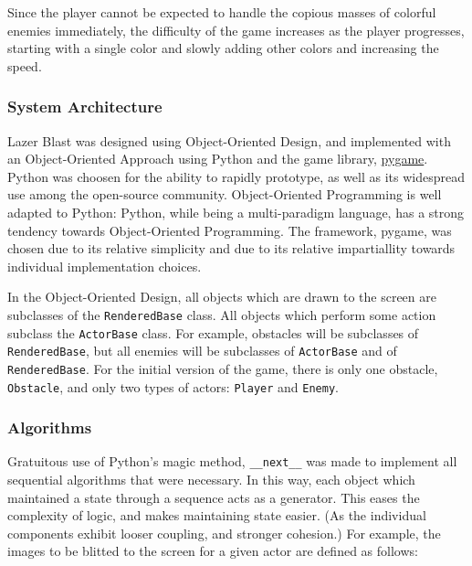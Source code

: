 Since the player cannot be expected to handle the copious masses
of colorful enemies immediately, the difficulty of the game increases
as the player progresses, starting with a single color and slowly
adding other colors and increasing the speed.

\subsubsection*{System Architecture}
Lazer Blast was designed using Object-Oriented Design, and implemented
with an Object-Oriented Approach using Python and the game library,
\href{http://pygame.org/news}{pygame}.  Python was choosen for the
ability to rapidly prototype, as well as its widespread use among
the open-source community.  Object-Oriented Programming is well
adapted to Python: Python, while being a multi-paradigm language,
has a strong tendency towards Object-Oriented Programming.  The
framework, pygame, was chosen due to its relative simplicity and due
to its relative impartiallity towards individual implementation choices.

In the Object-Oriented Design, all objects which are drawn to the screen
are subclasses of the \texttt{RenderedBase} class.  All
objects which perform some action subclass the \texttt{ActorBase}
class.  For example, obstacles will be subclasses of
\texttt{RenderedBase}, but all enemies will be subclasses of
\texttt{ActorBase} and of \texttt{RenderedBase}.
For the initial version of the game, there is only one obstacle,
\texttt{Obstacle}, and only two types of actors:
\texttt{Player} and \texttt{Enemy}.


\subsubsection*{Algorithms}

Gratuitous use of Python's magic method, \texttt{__next__}
was made to implement all sequential algorithms that were necessary.
In this way, each object which maintained a state through a sequence
acts as a generator.  This eases the complexity of logic, and makes
maintaining state easier. (As the individual components exhibit looser
coupling, and stronger cohesion.)  For example, the images to be blitted
to the screen for a given actor are defined as follows:

